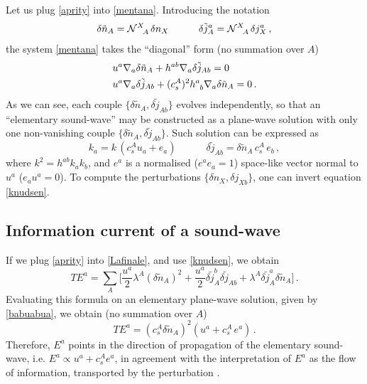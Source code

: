 \documentclass[a4paper, amsfonts, amssymb, amsmath, reprint, showkeys, nofootinbib, twoside, onecolumn,notitlepage]{revtex4-1}
\newcommand{\spc}{\quad \quad \quad}
\theoremstyle{definition}
\theoremstyle{theorem}
\begin{document}
Let us plug \eqref{aprity} into \eqref{mentana}. Introducing the notation
\begin{equation}\label{knudsen}
\delta \tilde{n}_A= \mathcal{N}\indices{^X _A} \delta n_X  \spc \delta \tilde{j}^a_A= \mathcal{N}\indices{^X _A} \delta j_X^a \, , 
\end{equation}
the system \eqref{mentana} takes the ``diagonal'' form (no summation over $A$)
\begin{equation}\label{abba}
\begin{split}
& u^a \nabla_a \delta \tilde{n}_A +h^{ab} \nabla_a \delta \tilde{j}_{Ab} =0\\
& u^a \nabla_a \delta \tilde{j}_{Ab} + (c_s^A)^2 h\indices{^a _b} \nabla_a \delta \tilde{n}_A =0 \, . \\
\end{split}
\end{equation}
As we can see, each couple $\{ \delta \tilde{n}_A , \delta \tilde{j}_{Ab} \}$ evolves independently, so that an ``elementary sound-wave'' may be constructed as a plane-wave solution with only one non-vanishing couple $\{ \delta \tilde{n}_A , \delta \tilde{j}_{Ab} \}$.  Such solution can be expressed as
\begin{equation}\label{babuabua}
k_a = k \, (c_s^A u_a + e_a)  \spc  \delta \tilde{j}_{Ab}  = \delta \tilde{n}_A \, c_s^A \, e_b \, , 
\end{equation}
where $k^2=h^{ab} k_a k_b$, and $e^a$ is a normalised ($e^a e_a =1$) space-like vector normal to $u^a$ ($e_a u^a=0$). To compute the perturbations $\{ \delta n_X , \delta j_{Xb} \}$, one can invert equation \eqref{knudsen}. 


\subsection{Information current of a sound-wave}

If we plug \eqref{aprity} into \eqref{Lafinale}, and use \eqref{knudsen}, we obtain
\begin{equation}\label{sisplitta}
TE^a = \sum_A \bigg[ \dfrac{u^a}{2}  \lambda^A (\delta \tilde{n}_A)^2 + \dfrac{u^a}{2} \delta \tilde{j}_A^b \delta \tilde{j}_{Ab}  + \lambda^A \delta \tilde{j}_A^a \delta \tilde{n}_A \bigg] \, .
\end{equation}
Evaluating this formula on an elementary plane-wave solution, given by \eqref{babuabua}, we obtain (no summation over $A$)
\begin{equation}
TE^a = (c_s^A \delta \tilde{n}_A)^2 (u^a + c_s^A \, e^a) \, .
\end{equation}
Therefore, $E^a$ points in the direction of propagation of the elementary sound-wave, i.e. $E^a \propto u^a + c_s^A e^a$, in agreement with the interpretation of $E^a$ as the flow of information, transported by the perturbation \cite{GavassinoCausality2021}.







\label{lastpage}
\end{document}
